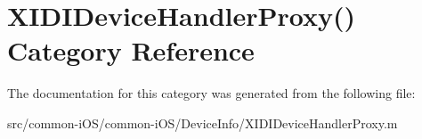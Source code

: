 \hypertarget{category_x_i_d_i_device_handler_proxy_07_08}{}\section{X\+I\+D\+I\+Device\+Handler\+Proxy() Category Reference}
\label{category_x_i_d_i_device_handler_proxy_07_08}


The documentation for this category was generated from the following file\+:\begin{DoxyCompactItemize}
\item 
src/common-\/i\+O\+S/common-\/i\+O\+S/\+Device\+Info/X\+I\+D\+I\+Device\+Handler\+Proxy.\+m\end{DoxyCompactItemize}
